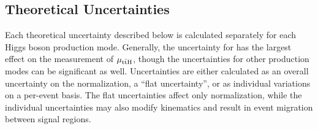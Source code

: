 \subsection{Theoretical Uncertainties}
Each theoretical uncertainty described below is calculated separately for each Higgs boson production mode.
Generally, the uncertainty for \ttH has the largest effect on the measurement of $\mu_{\mathrm{t\bar{t}H}}$, though the uncertainties for other production modes can be significant as well.
Uncertainties are either calculated as an overall uncertainty on the normalization, a ``flat uncertainty'', or as individual variations on a per-event basis.
The flat uncertainties affect only normalization, while the individual uncertainties may also modify kinematics and result in event migration between signal regions.
